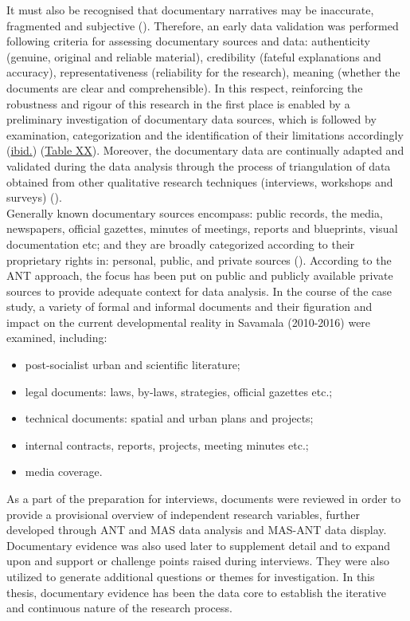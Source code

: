 \documentclass[11pt]{report}
\begin{document}
It must also be recognised that documentary narratives may be inaccurate, fragmented and subjective (\href{Foster}{\citealt{foster_power_1994}}). 
Therefore, an early data validation was performed following \href{Scott}{\citealt{scott_matter_1991}} criteria for assessing documentary sources and data: authenticity (genuine, original and reliable material), credibility (fateful explanations and accuracy), representativeness (reliability for the research), meaning (whether the documents are clear and comprehensible). In this respect, reinforcing the robustness and rigour of this research in the first place is enabled by a preliminary investigation of documentary data sources, which is followed by examination, categorization and the identification of their limitations accordingly (\href{Scott}{ibid.}) (\href{Table Data sources}{Table XX}). Moreover, the documentary data are continually adapted and validated during the data analysis through the process of triangulation of data obtained from other qualitative research techniques (interviews, workshops and surveys) 
 (\href{Yin}{\citealt{yin_case_2003}}).
\\

Generally known documentary sources encompass: public records, the media, newspapers, official gazettes, minutes of meetings, reports and blueprints, visual documentation etc; and they are broadly categorized according to their proprietary rights in: personal, public, and private sources (\href{Payne}{\citealt{payne_key_2004}}). According to the ANT approach, the focus has been put on public and publicly available private sources to provide adequate context for data analysis. In the course of the case study, a variety of formal and informal documents and their figuration and impact on the current developmental reality in Savamala (2010-2016) were examined, including:

\begin{itemize}
\item post-socialist urban and scientific literature;
\item legal documents: laws, by-laws, strategies, official gazettes etc.;
\item technical documents: spatial and urban plans and projects;
\item internal contracts, reports, projects, meeting minutes etc.;
\item media coverage. 
\end{itemize}

As a part of the preparation for interviews, documents were reviewed in order to provide a provisional overview of independent research variables, further developed through ANT and MAS data analysis and MAS-ANT data display. Documentary evidence was also used later to supplement detail and to expand upon and support or challenge points raised during interviews. They were also utilized to generate additional questions or themes for investigation. In this thesis, documentary evidence has been the data core to establish the iterative and continuous nature of the research process. 
\end{document}
